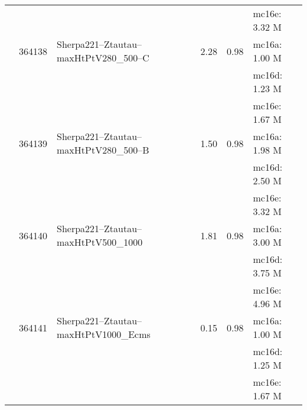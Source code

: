 \begin{center}
{\begin{xtabular}{lclS[round-mode=figures, round-precision=3]S[round-mode=places,  round-precision=2]l}
			& & & & & mc16e: 3.32 M \\
			& 364138 & Sherpa221--Ztautau--maxHtPtV280\_500--C & 2.28 & 0.98 &  mc16a: 1.00 M \\
			& & & & & mc16d: 1.23 M \\
			& & & & & mc16e: 1.67 M \\
			& 364139 & Sherpa221--Ztautau--maxHtPtV280\_500--B & 1.50 & 0.98 &  mc16a: 1.98 M \\
			& & & & & mc16d: 2.50 M \\
			& & & & & mc16e: 3.32 M \\
			& 364140 & Sherpa221--Ztautau--maxHtPtV500\_1000       & 1.81 & 0.98 &  mc16a: 3.00 M \\
			& & & & & mc16d: 3.75 M \\
			& & & & & mc16e: 4.96 M \\
			& 364141 & Sherpa221--Ztautau--maxHtPtV1000\_Ecms     & 0.15 & 0.98 &  mc16a: 1.00 M \\
			& & & & & mc16d: 1.25 M \\
			& & & & & mc16e: 1.67 M \\
		\end{xtabular}
}\end{center}

\clearpage


